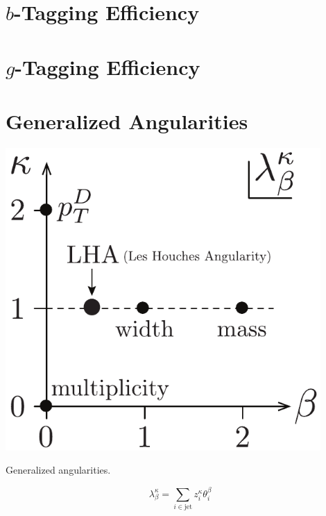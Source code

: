 \section{$b$-Tagging Efficiency}
\label{sec:q:b_tagging_effiency}





\section{$g$-Tagging Efficiency}
\label{sec:q:g_tagging_effiency}



\newpage

\section{Generalized Angularities}
\label{sec:q:generalized_angularities}


\begin{marginfigure}
  \centerfloat
  \includegraphics[width=0.9\textwidth]{figures/LHA/LHA.pdf}
  \caption[Generalized Angularities]
          {Generalized angularities.} 
  \label{fig:q:LHA}
\end{marginfigure}

\begin{equation}
  \lambda_\beta^\kappa = \sum_{i \in \mathrm{jet}} z_i^\kappa \theta_i^\beta
\end{equation}


